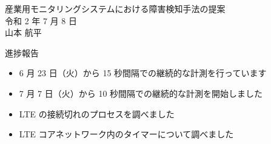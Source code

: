 \documentclass[a4j]{jarticle}
\begin{document}
\begin{table}[t]
\begin{center}
{\large 産業用モニタリングシステムにおける障害検知手法の提案}\\
令和 2 年 7 月 8 日\\
山本 航平
\end{center}
\end{table}

進捗報告
\begin{itemize}
\item 6 月 23 日（火）から 15 秒間隔での継続的な計測を行っています
\item 7 月 7 日（火）から 10 秒間隔での継続的な計測を開始しました
\item LTE の接続切れのプロセスを調べました
\item LTE コアネットワーク内のタイマーについて調べました
\end{itemize}
\end{document}
